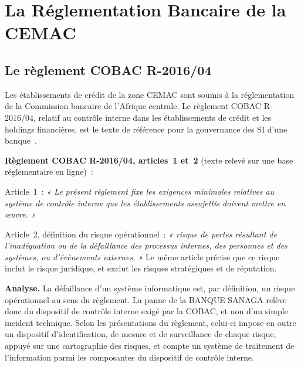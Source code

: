 \section{La Réglementation Bancaire de la CEMAC}
\label{sec:c10-cobac}

\subsection{Le règlement COBAC R-2016/04}

Les établissements de crédit de la zone CEMAC sont soumis à la
réglementation de la Commission bancaire de l'Afrique centrale. Le
règlement COBAC R-2016/04, relatif au contrôle interne dans les
établissements de crédit et les holdings financières, est le texte de
référence pour la gouvernance des SI d'une banque~\cite{cobac2016r04}.

\begin{boxjuris}
\textbf{Règlement COBAC R-2016/04, articles~1 et~2} (texte relevé sur une
base réglementaire en ligne)~:

\medskip
Article~1~: \textit{« Le présent règlement fixe les exigences minimales
relatives au système de contrôle interne que les établissements assujettis
doivent mettre en œuvre. »}

\medskip
Article~2, définition du risque opérationnel~: \textit{« risque de pertes
résultant de l'inadéquation ou de la défaillance des processus internes,
des personnes et des systèmes, ou d'évènements externes. »} Le même
article précise que ce risque inclut le risque juridique, et exclut les
risques stratégiques et de réputation.

\medskip
\textbf{Analyse.} La défaillance d'un système informatique est, par
définition, un risque opérationnel au sens du règlement. La panne de la
BANQUE SANAGA relève donc du dispositif de contrôle interne exigé par la
COBAC, et non d'un simple incident technique. Selon les présentations du
règlement, celui-ci impose en outre un dispositif d'identification, de
mesure et de surveillance de chaque risque, appuyé sur une cartographie
des risques, et compte un système de traitement de l'information parmi
les composantes du dispositif de contrôle interne.
\end{boxjuris}

